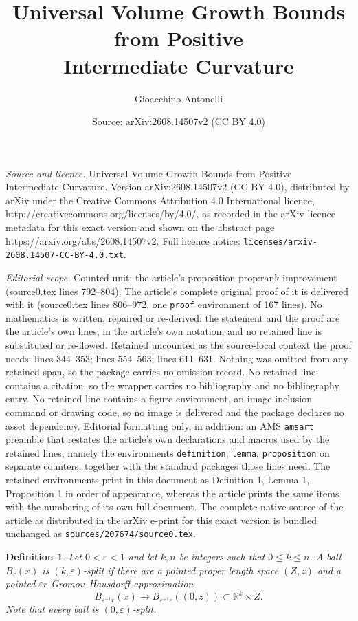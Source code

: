 \documentclass[10pt,a4paper]{amsart}
\title{Universal Volume Growth Bounds from Positive\\ Intermediate Curvature}
\author{Gioacchino Antonelli}
\date{Source: arXiv:2608.14507v2 (CC BY 4.0)}
\newtheorem{definition}{Definition}
\newcommand{\R}{\mathbb R}
\newcommand{\eps}{\varepsilon}
\begin{document}
\maketitle

\noindent\emph{Source and licence.} Universal Volume Growth Bounds from Positive\\ Intermediate Curvature. Version arXiv:2608.14507v2 (CC BY 4.0), distributed by arXiv under the Creative Commons Attribution 4.0 International licence, http://creativecommons.org/licenses/by/4.0/, as recorded in the arXiv licence metadata for this exact version and shown on the abstract page https://arxiv.org/abs/2608.14507v2. Full licence notice: \texttt{licenses/arxiv-2608.14507-CC-BY-4.0.txt}.\par\smallskip

\noindent\textit{Editorial scope.} Counted unit: the article's proposition prop:rank-improvement (source0.tex lines 792--804). The article's complete original proof of it is delivered with it (source0.tex lines 806--972, one \texttt{proof} environment of 167 lines). No mathematics is written, repaired or re-derived: the statement and the proof are the article's own lines, in the article's own notation, and no retained line is substituted or re-flowed.  Retained uncounted as the source-local context the proof needs: lines 344--353; lines 554--563; lines 611--631.  Nothing was omitted from any retained span, so the package carries no omission record.  No retained line contains a citation, so the wrapper carries no bibliography and no bibliography entry.  No retained line contains a figure environment, an image-inclusion command or drawing code, so no image is delivered and the package declares no asset dependency.  Editorial formatting only, in addition: an AMS \texttt{amsart} preamble that restates the article's own declarations and macros used by the retained lines, namely the environments \texttt{definition}, \texttt{lemma}, \texttt{proposition} on separate counters, together with the standard packages those lines need.  The retained environments print in this document as Definition 1, Lemma 1, Proposition 1 in order of appearance, whereas the article prints the same items with the numbering of its own full document.  The complete native source of the article as distributed in the arXiv e-print for this exact version is bundled unchanged as \texttt{sources/207674/source0.tex}.
\begin{definition}\label{def:metric-split}
Let $0<\eps<1$ and let $k,n$ be integers such that $0\leq k\leq n$.  A ball $B_r(x)$ is
\emph{$(k,\eps)$-split} if there are a pointed proper length space
$(Z,z)$ and a pointed $\eps r$-Gromov--Hausdorff approximation
\[
 B_{\eps^{-1}r}(x)\longrightarrow
 B_{\eps^{-1}r}((0,z))\subset\R^k\times Z.
\]
Note that every ball is $(0,\eps)$-split.
\end{definition}
\end{document}
